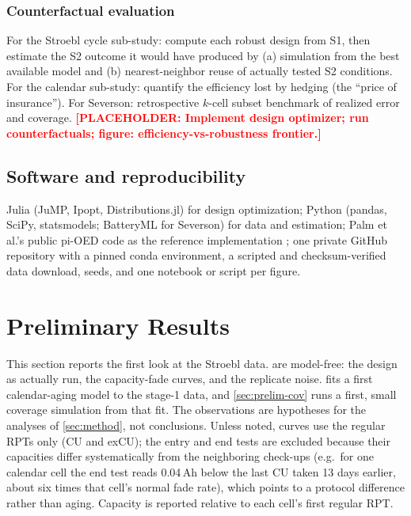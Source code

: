 \documentclass[11pt,letterpaper]{article}
\newcommand{\ph}[1]{\textcolor{red}{\textbf{[PLACEHOLDER: #1]}}}
\begin{document}
\subsubsection{Counterfactual evaluation}
For the Stroebl cycle sub-study: compute each robust design from S1, then estimate the S2 outcome it would have produced by (a) simulation from the best available model and (b) nearest-neighbor reuse of actually tested S2 conditions. For the calendar sub-study: quantify the efficiency lost by hedging (the ``price of insurance''). For Severson: retrospective $k$-cell subset benchmark of realized error and coverage. \ph{Implement design optimizer; run counterfactuals; figure: efficiency-vs-robustness frontier.}

\subsection{Software and reproducibility}
Julia (JuMP, Ipopt, Distributions.jl) for design optimization; Python (pandas, SciPy, statsmodels; BatteryML for Severson) for data and estimation; Palm et al.'s public pi-OED code as the reference implementation \cite{palm2022}; one private GitHub repository with a pinned conda environment, a scripted and checksum-verified data download, seeds, and one notebook or script per figure.

\section{Preliminary Results}\label{sec:prelim}
This section reports the first look at the Stroebl data.  are model-free: the design as actually run, the capacity-fade curves, and the replicate noise.  fits a first calendar-aging model to the stage-1 data, and \cref{sec:prelim-cov} runs a first, small coverage simulation from that fit. The observations are hypotheses for the analyses of \cref{sec:method}, not conclusions. Unless noted, curves use the regular RPTs only (CU and exCU); the entry and end tests are excluded because their capacities differ systematically from the neighboring check-ups (e.g.\ for one calendar cell the end test reads 0.04\,Ah below the last CU taken 13 days earlier, about six times that cell's normal fade rate), which points to a protocol difference rather than aging. Capacity is reported relative to each cell's first regular RPT.
\end{document}
